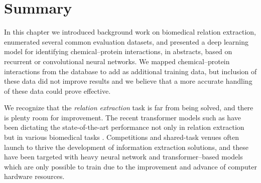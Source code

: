 \section{Summary}

In this chapter we introduced background work on biomedical relation extraction, enumerated several common evaluation datasets, and presented a deep learning model for identifying chemical--protein interactions, in  abstracts, based on recurrent or convolutional neural networks.
We mapped chemical--protein interactions from the  database to add as additional training data, but inclusion of these data did not improve results and we believe that a more accurate handling of these data could prove effective.

We recognize that the \textit{relation extraction} task is far from being solved, and there is plenty room for improvement.
The recent transformer models such as  \parencite{devlin2019a} have been dictating the state-of-the-art performance not only in relation extraction but in various biomedical  tasks \parencite{peng2019a,gu2021a}.
Competitions and shared-task venues often launch to thrive the development of information extraction solutions, and these have been targeted with heavy neural network and transformer--based models which are only possible to train due to the improvement and advance of computer hardware resources.
